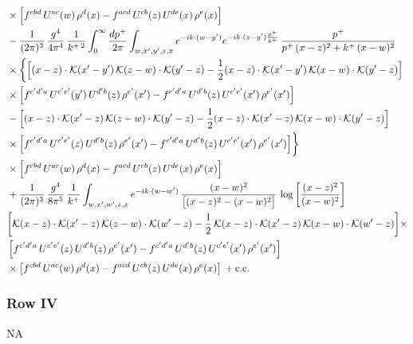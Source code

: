 \documentclass[9pt]{article}
\numberwithin{equation}{section}
\begin{document}
\begin{align}
&\times\Big[f^{cbd}\,U^{ac}(w)\,\rho^{d}(x)-f^{acd}\,U^{cb}(z)\,U^{de}(x)\,\rho^{e}(x)\Big]\notag\\
&-\frac{1}{(2\pi)^{3}}\,\frac{g^{4}}{4\pi^{4}}\,\frac{1}{k^{+\,2}}\int_{0}^{\infty}\frac{dp^{+}}{2\pi}\int_{w,x',y',z,x}e^{-ik\cdot{(w-y')}}e^{-ik\cdot{(z-y')}\frac{p^{+}}{k^{+}}}\,\frac{p^{+}}{p^{+}\,(x-z)^{2}+k^{+}\,(x-w)^{2}}\notag\\
&\times\bigg\{\Big[(x-z)\cdot\mathcal{K}(x'-y')\,\mathcal{K}(z-w)\cdot\mathcal{K}(y'-z)-\frac{1}{2}(x-z)\cdot\mathcal{K}(x'-y')\,\mathcal{K}(x-w)\cdot\mathcal{K}(y'-z)\Big]\notag\\
&\times\Big[f^{c'd'a}\,U^{c'e'}(y')\,U^{d'b}(z)\,\rho^{e'}(x')-f^{c'd'a}\,U^{d'b}(z)\,U^{c'e'}(x')\,\rho^{e'}(x')\Big]\notag\\
&-\Big[(x-z)\cdot\mathcal{K}(x'-z)\,\mathcal{K}(z-w)\cdot\mathcal{K}(y'-z)-\frac{1}{2}(x-z)\cdot\mathcal{K}(x'-z)\,\mathcal{K}(x-w)\cdot\mathcal{K}(y'-z)\Big]\notag\\
&\times\Big[f^{c'd'a}\,U^{c'e'}(z)\,U^{d'b}(z)\,\rho^{e'}(x')-f^{c'd'a}\,U^{d'b}(z)\,U^{c'e'}(x')\,\rho^{e'}(x')\Big]\bigg\}\notag\\
&\times\Big[f^{cbd}\,U^{ac}(w)\,\rho^{d}(x)-f^{acd}\,U^{cb}(z)\,U^{de}(x)\,\rho^{e}(x)\Big]\notag\\
& +\frac{1}{(2\pi)^{3}}\,\frac{g^{4}}{8\pi^{5}}\,\frac{1}{k^{+}}\int_{w,x',w',z,x}e^{-ik\cdot{(w-w')}}\,\frac{(x-w)^{2}}{\big[(x-z)^{2}-(x-w)^{2}\big]}\,\log\left[\frac{(x-z)^{2}}{(x-w)^{2}}\right]\notag \\ &  \bigg[\mathcal{K}(x-z)\cdot\mathcal{K}(x'-z)\,\mathcal{K}(z-w)\cdot\mathcal{K}(w'-z)-\frac{1}{2}\,\mathcal{K}(x-z)\cdot\mathcal{K}(x'-z)\,\mathcal{K}(x-w)\cdot\mathcal{K}(w'-z)\bigg]   \times\notag \\ & \left[f^{c'd'a}\,U^{c'e'}(z)\,U^{d'b}(z)\,\rho^{e'}(x')-f^{c'd'a}\, U^{d'b}(z)\,U^{c'e'}(x')\,\rho^{e'}(x')\right]\notag\\ &\times\left[f^{cbd}\,U^{ac}(w)\,\rho^{d}(x) -f^{acd}\,U^{cb}(z)\,U^{de}(x)\,\rho^{e}(x)\right]\,+{\rm c.c.}
\label{eq:D-III.III-2o}
\end{align}
\subsubsection*{Row IV}
\textsc{NA}
\end{document}
